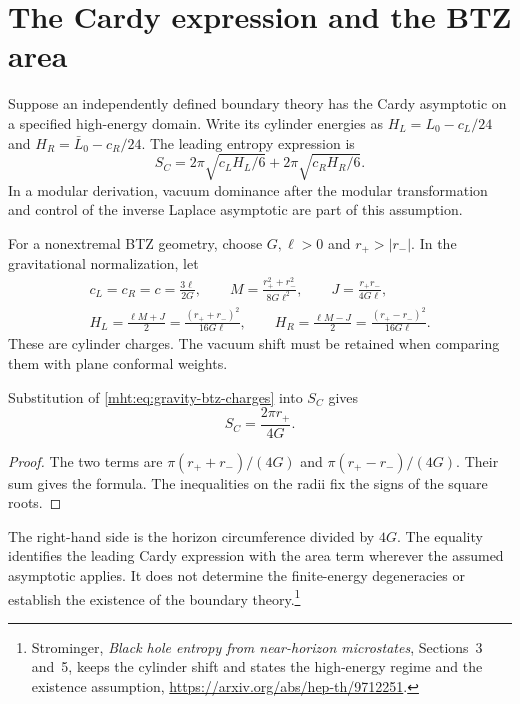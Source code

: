 \section{The Cardy expression and the BTZ area}

Suppose an independently defined boundary theory has the Cardy
asymptotic on a specified high-energy domain.
Write its cylinder energies as
$H_L=L_0-c_L/24$ and $H_R=\bar L_0-c_R/24$.
The leading entropy expression is
\[
 S_C=2\pi\sqrt{c_LH_L/6}+2\pi\sqrt{c_RH_R/6}.
\]
In a modular derivation, vacuum dominance after the modular
transformation and control of the inverse Laplace asymptotic
are part of this assumption.

For a nonextremal BTZ geometry, choose $G,\ell>0$ and
$r_+>|r_-|$. In the gravitational normalization, let
\begin{equation}\label{mht:eq:gravity-btz-charges}
 \begin{gathered}
 c_L=c_R=c=\frac{3\ell}{2G},\qquad
 M=\frac{r_+^2+r_-^2}{8G\ell^2},\qquad
 J=\frac{r_+r_-}{4G\ell},\\
 H_L=\frac{\ell M+J}{2}
     =\frac{(r_++r_-)^2}{16G\ell},\qquad
 H_R=\frac{\ell M-J}{2}
     =\frac{(r_+-r_-)^2}{16G\ell}.
 \end{gathered}
\end{equation}
These are cylinder charges. The vacuum shift must be retained
when comparing them with plane conformal weights.

\begin{proposition}\label{mht:prop:gravity-cardy-area}
Substitution of \eqref{mht:eq:gravity-btz-charges} into $S_C$ gives
\[
 S_C=\frac{2\pi r_+}{4G}.
\]
\end{proposition}

\begin{proof}
The two terms are
$\pi(r_++r_-)/(4G)$ and $\pi(r_+-r_-)/(4G)$.
Their sum gives the formula. The inequalities on the radii fix
the signs of the square roots.
\end{proof}

The right-hand side is the horizon circumference divided by $4G$.
The equality identifies the leading Cardy expression with the
area term wherever the assumed asymptotic applies.
It does not determine the finite-energy degeneracies or establish
the existence of the boundary theory.\footnote{Strominger,
\emph{Black hole entropy from near-horizon microstates},
Sections~3 and~5, keeps the cylinder shift and states the
high-energy regime and the existence assumption,
\url{https://arxiv.org/abs/hep-th/9712251}.}

